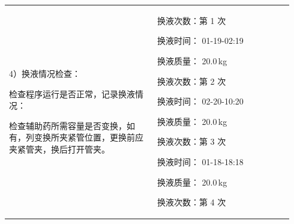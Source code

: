 \documentclass[UTF8,10pt,a4paper,fontset=fandol]{ctexart}
\newcommand{\fieldvalue}[1]{#1}
\newcommand{\handwritten}[1]{#1}
\begin{document}
\begin{tabular}{|p{0.49\linewidth}|p{0.45\linewidth}|}
\hline
\begin{minipage}[t]{0.45\linewidth}
\vspace{0.42\linewidth}

4）换液情况检查：

检查程序运行是否正常，记录换液情况：

检查辅助药所需容量是否变换，如有，列变换所夹紧管位置，更换前应夹紧管夹，换后打开管夹。
\end{minipage}
&
\begin{minipage}[t]{0.41\linewidth}
换液次数：第
\fieldvalue{\handwritten{1}}
次

换液时间：
\fieldvalue{\handwritten{01-19-02:19}}

换液质量：
\fieldvalue{\handwritten{20.0}}\,kg

\vspace{0.2cm}

换液次数：第
\fieldvalue{\handwritten{2}}
次

换液时间：
\fieldvalue{\handwritten{02-20-10:20}}

换液质量：
\fieldvalue{\handwritten{20.0}}\,kg

\vspace{0.2cm}

换液次数：第
\fieldvalue{\handwritten{3}}
次

换液时间：
\fieldvalue{\handwritten{01-18-18:18}}

换液质量：
\fieldvalue{\handwritten{20.0}}\,kg

\vspace{0.2cm}

换液次数：第
\fieldvalue{\handwritten{4}}
次


\end{minipage}
\end{tabular}
\end{document}
